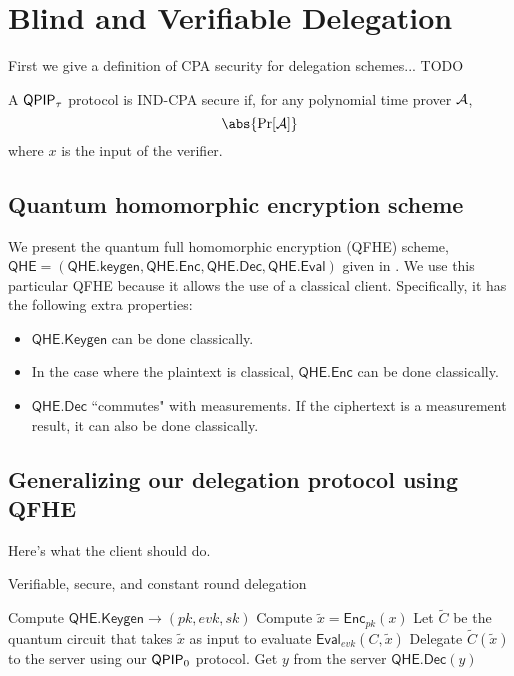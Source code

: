 \section{Blind and Verifiable Delegation}


First we give a definition of CPA security for delegation schemes... TODO

\begin{dfn}
	A $\operatorname{\mathsf{QPIP}}_\tau$ protocol is IND-CPA secure if, for any polynomial time prover $\mathcal{A}$,
	$$\abs{\Pr[\cA]}$$
	where $x$ is the input of the verifier.
\end{dfn}

\subsection{Quantum homomorphic encryption scheme}


We present the quantum full homomorphic encryption (QFHE) scheme, $\mathsf{QHE}=(\mathsf{QHE.keygen}, \mathsf{QHE.Enc}, \mathsf{QHE.Dec}, \mathsf{QHE.Eval})$ given in \cite{mahadev_qfhe}. We use this particular QFHE because it allows the use of a classical client. Specifically, it has the following extra properties:
\begin{itemize}
	\item $\mathsf{QHE.Keygen}$ can be done classically.
	\item In the case where the plaintext is classical, $\mathsf{QHE.Enc}$ can be done classically.
	\item $\mathsf{QHE.Dec}$ ``commutes" with measurements.  If the ciphertext is a measurement result, it can also be done classically.
\end{itemize}

\subsection{Generalizing our delegation protocol using QFHE}


Here's what the client should do.

\begin{algorithm}
	\caption{Verifiable, secure, and constant round delegation}
	\label{ProtoPrivateDelegation}
	\begin{algorithmic}[1]
			\State Compute $\mathsf{QHE.Keygen}\rightarrow(pk, evk, sk)$
			\State Compute $\tilde{x}=\mathsf{Enc}_{pk}(x)$
			\State Let $\tilde{C}$ be the quantum circuit that takes $\tilde{x}$ as input to evaluate $\mathsf{Eval}_{evk}(C, \tilde{x})$
			\State Delegate $\tilde{C}(\tilde{x})$ to the server using our $\operatorname{\mathsf{QPIP}}_0$ protocol.
			\State Get $y$ from the server
			\State \Return $\mathsf{QHE.Dec}(y)$
		\EndProcedure
	\end{algorithmic}
\end{algorithm}

